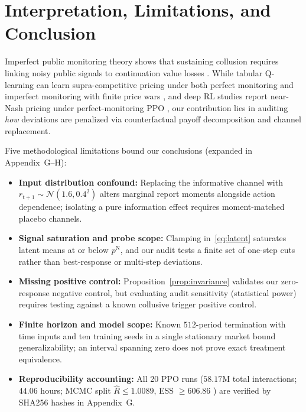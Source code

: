 \section{Interpretation, Limitations, and Conclusion}

Imperfect public monitoring theory shows that sustaining collusion requires linking noisy public signals to continuation value losses \citep{green1984noncooperative, abreu1990toward, fudenberg1994folk}. While tabular Q-learning can learn supra-competitive pricing under both perfect monitoring \citep{calvano2020artificial} and imperfect monitoring with finite price wars \citep{calvano2021algorithmic}, and deep RL studies report near-Nash pricing under perfect-monitoring PPO \citep{deng2025exploring}, our contribution lies in auditing \emph{how} deviations are penalized via counterfactual payoff decomposition and channel replacement.

Five methodological limitations bound our conclusions (expanded in Appendix~G--H):
\begin{itemize}
\item \textbf{Input distribution confound:} Replacing the informative channel with $r_{t+1}\sim\mathcal{N}(1.6,0.4^2)$ alters marginal report moments alongside action dependence; isolating a pure information effect requires moment-matched placebo channels.
\item \textbf{Signal saturation and probe scope:} Clamping in~\eqref{eq:latent} saturates latent means at or below $p^{\mathrm{N}}$, and our audit tests a finite set of one-step cuts rather than best-response or multi-step deviations.
\item \textbf{Missing positive control:} Proposition~\ref{prop:invariance} validates our zero-response negative control, but evaluating audit sensitivity (statistical power) requires testing against a known collusive trigger positive control.
\item \textbf{Finite horizon and model scope:} Known $512$-period termination with time inputs and ten training seeds in a single stationary market bound generalizability; an interval spanning zero does not prove exact treatment equivalence.
\item \textbf{Reproducibility accounting:} All 20 PPO runs ($58.17$M total interactions; $44.06$ hours; MCMC split $\hat{R}\le 1.0089$, ESS $\ge 606.86$ \citep{vehtari2021rank}) are verified by SHA256 hashes in Appendix~G.
\end{itemize}

